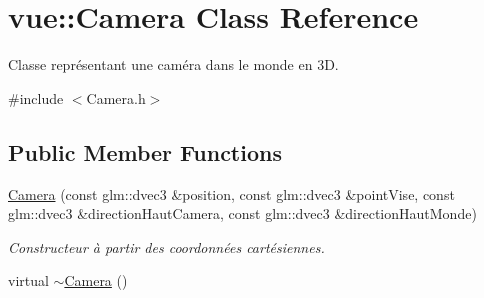 \hypertarget{classvue_1_1_camera}{}\section{vue\+:\+:Camera Class Reference}
\label{classvue_1_1_camera}


Classe représentant une caméra dans le monde en 3\+D.  




{\ttfamily \#include $<$Camera.\+h$>$}

\subsection*{Public Member Functions}
\begin{DoxyCompactItemize}
\item 
\hyperlink{classvue_1_1_camera_a0c7869e1153f216e88fc15eb5ac37ce4}{Camera} (const glm\+::dvec3 \&position, const glm\+::dvec3 \&point\+Vise, const glm\+::dvec3 \&direction\+Haut\+Camera, const glm\+::dvec3 \&direction\+Haut\+Monde)
\begin{DoxyCompactList}\small\item\em Constructeur à partir des coordonnées cartésiennes. \end{DoxyCompactList}\item 
\hypertarget{classvue_1_1_camera_a173cf3a9d91b30cadd21d72149df4504}{}virtual \hyperlink{classvue_1_1_camera_a173cf3a9d91b30cadd21d72149df4504}{$\sim$\+Camera} ()\label{classvue_1_1_camera_a173cf3a9d91b30cadd21d72149df4504}


\end{DoxyCompactItemize}
